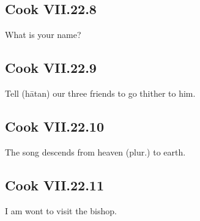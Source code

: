 \par\begin{minipage}{\linewidth}\raggedright
\subsection*{Cook VII.22.8}

What is your name?

\end{minipage}\par\addvspace{4pt}

\par\begin{minipage}{\linewidth}\raggedright
\subsection*{Cook VII.22.9}

Tell (hātan) our three friends to go thither to him.

\end{minipage}\par\addvspace{4pt}

\par\begin{minipage}{\linewidth}\raggedright
\subsection*{Cook VII.22.10}

The song descends from heaven (plur.) to earth.

\end{minipage}\par\addvspace{4pt}

\par\begin{minipage}{\linewidth}\raggedright
\subsection*{Cook VII.22.11}

I am wont to visit the bishop.

\end{minipage}\par\addvspace{4pt}

